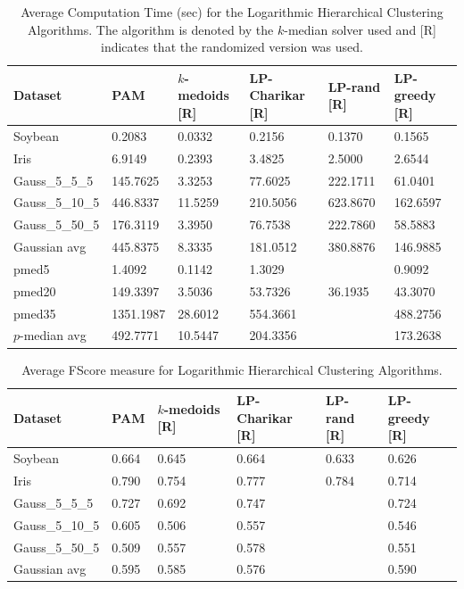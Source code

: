 \documentclass[conference, 10pt, final]{IEEEtran}
\begin{document}
\begin{table}[!t]
\label{fig:hier_log_results_comp}
\caption{Average Computation Time (sec) for the Logarithmic Hierarchical Clustering Algorithms. The algorithm is denoted by the $k$-median solver used and [R] indicates that the randomized version was used.}
\centering
\begin{tabular}{ | l | l | l | l | l | l | }
\hline
Dataset	&	PAM	&	$k$-medoids [R]	&	LP-Charikar [R]	&	LP-rand [R]	&	LP-greedy [R]	\\ \hline
Soybean	&	0.2083	&	0.0332	&	0.2156	&	0.1370	&	0.1565	\\
Iris	&	6.9149	&	0.2393	&	3.4825	&	2.5000	&	2.6544	\\
Gauss\_5\_5\_5	&	145.7625	&	3.3253	&	77.6025	&	222.1711	&	61.0401	\\
Gauss\_5\_10\_5	&	446.8337	&	11.5259	&	210.5056	&	623.8670 	&	162.6597	\\
Gauss\_5\_50\_5	&	176.3119	&	3.3950	&	76.7538	&	222.7860 	&	58.5883	\\
Gaussian avg	&	445.8375	&	8.3335	&	181.0512	&	380.8876 	&	146.9885	\\
pmed5	&	1.4092	&	0.1142	&	1.3029	&		&	0.9092	\\
pmed20	&	149.3397	&	3.5036	&	53.7326	&	36.1935	&	43.3070	\\
pmed35	&	1351.1987	&	28.6012	&	554.3661	&		&	488.2756	\\
$p$-median avg	&	492.7771	&	10.5447	&	204.3356	&		&	173.2638	\\ \hline
\end{tabular}
\end{table}

\begin{table}[!t]
\label{fig:hier_log_results_FScore}
\caption{Average FScore measure for Logarithmic Hierarchical Clustering Algorithms.}
\centering
\begin{tabular}{ | l | l | l | l | l | l | }
\hline
Dataset	&	PAM	&	$k$-medoids [R]	&	LP-Charikar [R]	&	LP-rand [R]	&	LP-greedy [R]	\\ \hline
Soybean	&	0.664	&	0.645	&	0.664	&	0.633	&	0.626	\\
Iris	&	0.790	&	0.754	&	0.777	&	0.784	&	0.714	\\
Gauss\_5\_5\_5	&	0.727	&	0.692	&	0.747	&		&	0.724	\\
Gauss\_5\_10\_5	&	0.605	&	0.506	&	0.557	&		&	0.546	\\
Gauss\_5\_50\_5	&	0.509	&	0.557	&	0.578	&		&	0.551	\\
Gaussian avg	&	0.595	&	0.585	&	0.576	&		&	0.590	\\ \hline
\end{tabular}
\end{table}
\end{document}
